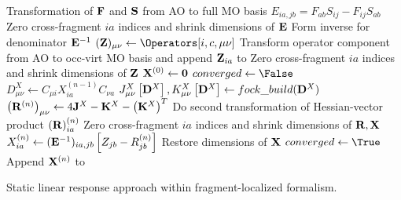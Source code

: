 \begin{algorithm}
  \centering
  \begin{algorithmic}[1]
    \State Transformation of \(\mathbf{F}\) and \(\mathbf{S}\) from AO to full MO basis
    \State \(E_{ia,jb} = F_{ab}S_{ij} - F_{ij}S_{ab}\)
    \If{\Not{} \AllowCT{}}
      \State Zero cross-fragment \(ia\) indices and shrink dimensions of \(\mathbf{E}\)
    \EndIf
    \State Form inverse for denominator \(\mathbf{E}^{-1}\)
  \EndFor
      \State \((\mat{Z})_{\mu\nu} \gets \Operators[i,c,\mu\nu]\)
      \State Transform operator component from AO to occ-virt MO basis and append \(\mathbf{Z}_{ia}\) to \Rhsvecs
      \If{\Not{} \AllowCT{}}
        \State Zero cross-fragment \(ia\) indices and shrink dimensions of \(\mathbf{Z}\)
      \EndIf
      \State \(\mathbf{X}^{(0)} \gets \mathbf{0}\)
      \State \(converged \gets \False\)
        \State \(D_{\mu\nu}^{X} \gets C_{\mu i} X_{ia}^{(n-1)} C_{\nu a}\)
        \State \(J_{\mu\nu}^{X}\left[\mathbf{D}^{X}\right], K_{\mu\nu}^{X}\left[\mathbf{D}^{X}\right] \gets fock\_build(\mathbf{D}^{X})\)
        \State \(\left(\mathbf{R}^{(n)}\right)_{\mu\nu} \gets 4 \mathbf{J}^{X} - \mathbf{K}^{X} - \left(\mathbf{K}^{X}\right)^{T}\)
        \State Do second transformation of Hessian-vector product \(\left(\mathbf{R}\right)_{ia}^{(n)}\)
        \If{\Not{} \AllowCT{}}
          \State Zero cross-fragment \(ia\) indices and shrink dimensions of \(\mathbf{R}, \mathbf{X}\)
        \EndIf
        \State \(X_{ia}^{(n)} \gets (\mathbf{E}^{-1})_{ia,jb} \left[ Z_{jb} - R_{jb}^{(n)} \right]\)
        \If{\Not{} \AllowCT{}}
          \State Restore dimensions of \(\mathbf{X}\)
        \EndIf
          \State \(converged \gets \True\)
          \State Append \(\mathbf{X}^{(n)}\) to \Rspvecs
          \State \Break
        \EndIf
  \end{algorithmic}
  \caption{Static linear response approach within fragment-localized formalism.}
  \label{alg:solve-linear-response}
\end{algorithm}
